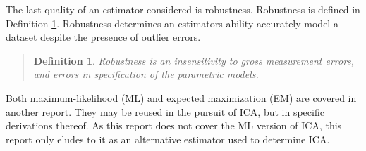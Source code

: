 \documentclass[12pt ]{article}
\newtheorem{adef}[thm]{Definition}
\begin{document}
The last quality of an estimator considered is robustness.  Robustness is defined in Definition \ref{robustnessDefinition}.  Robustness determines an estimators ability accurately model a dataset despite the presence of outlier errors.  
\begin{quote}
	\begin{adef}
	\label{robustnessDefinition}
	Robustness is an insensitivity to gross measurement errors, and errors in specification of the parametric models.	
	\end{adef}
	\cite[83]{appo-ica-book}
\end{quote}

Both maximum-likelihood (ML) and expected maximization (EM) are covered in another report.  They may be reused in the pursuit of ICA, but in specific derivations thereof.  As this report does not cover the ML version of ICA, this report only eludes to it as an alternative estimator used to determine ICA. 
\end{document}
